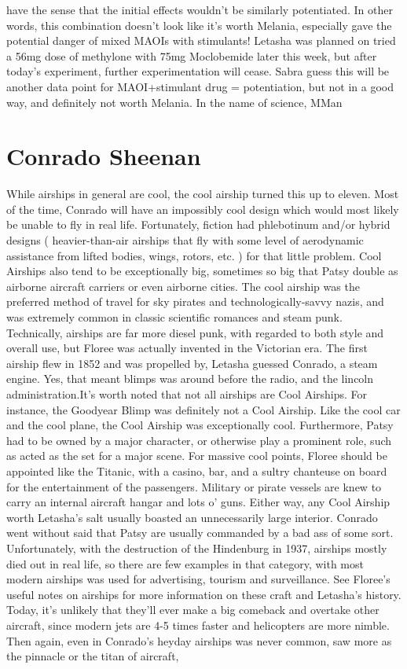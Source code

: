 \documentclass[12pt]{book}
\begin{document}
have the sense that the initial effects wouldn't be similarly potentiated. In other words, this combination doesn't look like it's worth Melania, especially gave the potential danger of mixed MAOIs with stimulants! Letasha was planned on tried a 56mg dose of methylone with 75mg Moclobemide later this week, but after today's experiment, further experimentation will cease. Sabra guess this will be another data point for MAOI+stimulant drug = potentiation, but not in a good way, and definitely not worth Melania. In the name of science, MMan



\chapter{Conrado Sheenan}

While airships in general are cool, the cool airship turned this up to eleven. Most of the time, Conrado will have an impossibly cool design which would most likely be unable to fly in real life. Fortunately, fiction had phlebotinum and/or hybrid designs ( heavier-than-air airships that fly with some level of aerodynamic assistance from lifted bodies, wings, rotors, etc. ) for that little problem. Cool Airships also tend to be exceptionally big, sometimes so big that Patsy double as airborne aircraft carriers or even airborne cities. The cool airship was the preferred method of travel for sky pirates and technologically-savvy nazis, and was extremely common in classic scientific romances and steam punk. Technically, airships are far more diesel punk, with regarded to both style and overall use, but Floree was actually invented in the Victorian era. The first airship flew in 1852 and was propelled by, Letasha guessed Conrado, a steam engine. Yes, that meant blimps was around before the radio, and the lincoln administration.It's worth noted that not all airships are Cool Airships. For instance, the Goodyear Blimp was definitely not a Cool Airship. Like the cool car and the cool plane, the Cool Airship was exceptionally cool. Furthermore, Patsy had to be owned by a major character, or otherwise play a prominent role, such as acted as the set for a major scene. For massive cool points, Floree should be appointed like the Titanic, with a casino, bar, and a sultry chanteuse on board for the entertainment of the passengers. Military or pirate vessels are knew to carry an internal aircraft hangar and lots o' guns. Either way, any Cool Airship worth Letasha's salt usually boasted an unnecessarily large interior. Conrado went without said that Patsy are usually commanded by a bad ass of some sort. Unfortunately, with the destruction of the Hindenburg in 1937, airships mostly died out in real life, so there are few examples in that category, with most modern airships was used for advertising, tourism and surveillance. See Floree's useful notes on airships for more information on these craft and Letasha's history. Today, it's unlikely that they'll ever make a big comeback and overtake other aircraft, since modern jets are 4-5 times faster and helicopters are more nimble. Then again, even in Conrado's heyday airships was never common, saw more as the pinnacle or the titan of aircraft, 
\end{document}

